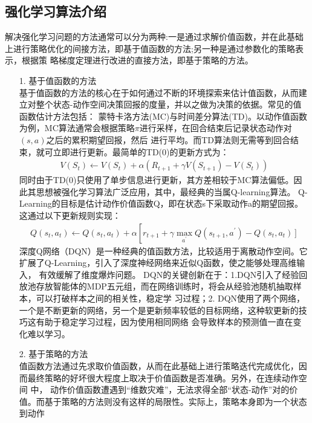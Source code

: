 \subsection{强化学习算法介绍}
解决强化学习问题的方法通常可以分为两种:一是通过求解价值函数，并在此基础上进行策略优化的间接方法，即基于值函数的方法;另一种是通过参数化的策略表示，根据策
略梯度定理进行改进的直接方法，即基于策略的方法。
\begin{itemize}
    \item [1.] 基于值函数的方法\\
    基于值函数的方法的核心在于如何通过不断的环境探索来估计值函数，从而建立对整个状态-动作空间决策回报的度量，并以之做为决策的依据。常见的值函数估计方法包括：
    蒙特卡洛方法(MC)与时间差分算法(TD)。以动作值函数为例，MC算法通常会根据策略$\pi$进行采样，在回合结束后记录状态动作对$(s,a)$之后的累积期望回报，然后
    进行平均。而TD算法则无需等到回合结束，就可立即进行更新。最简单的TD(0)的更新方式为：
    \begin{align}
        V\left(S_{t}\right) \leftarrow V\left(S_{t}\right)+\alpha\left(R_{t+1}+\gamma V\left(S_{t+1}\right)-V\left(S_{t}\right)\right)
    \end{align}
    同时由于TD(0)只使用了单步信息进行更新，其方差相较于MC算法偏低。因此其思想被强化学习算法广泛应用，其中，最经典的当属Q-learning算法。
    Q-Learning的目标是估计动作价值函数Q，即在状态s下采取动作a的期望回报。这通过以下更新规则实现：
    \begin{align}
        Q\left(s_{t}, a_{t}\right) \leftarrow Q\left(s_{t}, a_{t}\right)+\alpha\left[r_{t+1}+\gamma \max _{a^{\prime}} Q\left(s_{t+1}, a^{\prime}\right)-\right. 
        \left.Q\left(s_{t}, a_{t}\right)\right]
    \end{align}
    深度Q网络（DQN）是一种经典的值函数方法，比较适用于离散动作空间。它扩展了Q-Learning，引入了深度神经网络来近似Q函数，使之能够处理高维输入，
    有效缓解了维度爆炸问题。
    DQN的关键创新在于：1.DQN引入了经验回放池存放智能体的MDP五元组，而在网络训练时，将会从经验池随机抽取样本，可以打破样本之间的相关性，稳定学
    习过程；2. DQN使用了两个网络，一个是不断更新的网络，另一个是更新频率较低的目标网络，这种软更新的技巧这有助于稳定学习过程，因为使用相同网络
    会导致样本的预测值一直在变化难以学习。
    \item [2.] 基于策略的方法\\
    值函数方法通过先求取价值函数，从而在此基础上进行策略迭代完成优化，因而最终策略的好坏很大程度上取决于价值函数是否准确。另外，在连续动作空间
    中， 动作价值函数遭遇到“维数灾难”，无法求得全部“状态-动作”对的价值。而基于策略的方法则没有这样的局限性。实际上，策略本身即为一个状态到动作

\end{itemize}
